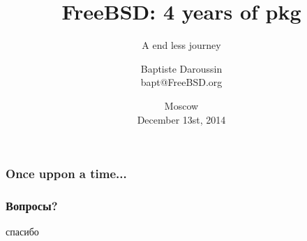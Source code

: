 
\newcommand{\prestitle}{RuBSD 14}

\title{FreeBSD: 4 years of pkg}
\subtitle{A end less journey}
\author{Baptiste Daroussin \\ bapt@FreeBSD.org}
\date{Moscow \\ December 13st, 2014}


\begin{frame}[plain]
	\titlepage
\end{frame}

\begin{frame}
	\frametitle{Once uppon a time...}
\end{frame}

\begin{frame}[plain]
	\frametitle{Вопросы?}
	\begin{center}
		\huge{спасибо}
	\end{center}
\end{frame}


